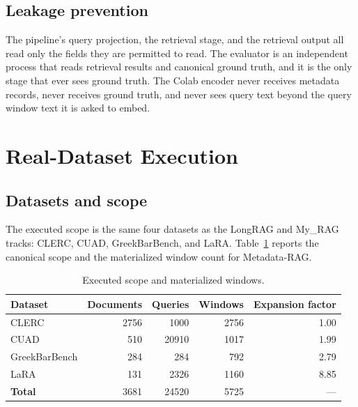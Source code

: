 \documentclass[11pt,a4paper]{article}
\begin{document}
\subsection{Leakage prevention}
The pipeline's query projection, the retrieval stage, and the
retrieval output all read only the fields they are permitted to
read. The evaluator is an independent process that reads retrieval
results and canonical ground truth, and it is the only stage that
ever sees ground truth. The Colab encoder never receives metadata
records, never receives ground truth, and never sees query text
beyond the query window text it is asked to embed.

\section{Real-Dataset Execution}\label{sec:real}

\subsection{Datasets and scope}
The executed scope is the same four datasets as the LongRAG and
My\_RAG tracks: CLERC, CUAD, GreekBarBench, and LaRA.
Table~\ref{tab:datasets} reports the canonical scope and the
materialized window count for Metadata-RAG.

\begin{table}[h]
\centering
\caption{Executed scope and materialized windows.}
\label{tab:datasets}
\small
\begin{tabular}{l r r r r}
\toprule
\textbf{Dataset} & \textbf{Documents} & \textbf{Queries}
  & \textbf{Windows} & \textbf{Expansion factor} \\
\midrule
CLERC              & \num{2756} & \num{1000}  & \num{2756}
                   & \num{1.00} \\
CUAD               & \num{510}  & \num{20910} & \num{1017}
                   & \num{1.99} \\
GreekBarBench      & \num{284}  & \num{284}   & \num{792}
                   & \num{2.79} \\
LaRA               & \num{131}  & \num{2326}  & \num{1160}
                   & \num{8.85} \\
\midrule
\textbf{Total}     & \num{3681} & \num{24520} & \num{5725}
                   & --- \\
\bottomrule
\end{tabular}
\end{table}
\end{document}
